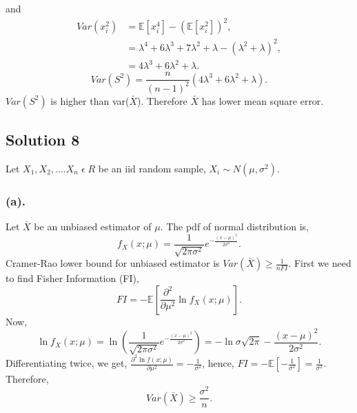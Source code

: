 \documentclass[a4paper,english,12pt]{article}
\begin{document}
and
\begin{align*}
Var(x_i^{2})&=\mathbb{E}[x_{i}^{4}]-(\mathbb{E}[x_i^{2}])^{2},\\
&=\lambda^{4}+6\lambda^{3}+7\lambda^{2}+\lambda-(\lambda^{2}+\lambda)^{2},\\
&=4\lambda^{3}+6\lambda^{2}+\lambda.
\end{align*}
\begin{equation*}
Var(S^{2}) = \frac{n}{(n-1)^{2}} (4\lambda^{3} + 6\lambda^{2} + \lambda).
\end{equation*}
$Var(S^{2})$ is higher than var($\bar X$). Therefore $\bar X$ has lower mean square error.
\hypertarget{solution8}{\subsection*{Solution 8}}
Let $X_1,X_2,....X_n\;\epsilon\;R$ be an iid random sample, $X_i\sim N(\mu,\sigma^{2})$.
\subsubsection*{(a).}
Let $\bar X$ be an unbiased estimator of $\mu$. The pdf of normal distribution is,
\begin{equation*}
f_{X}(x;\mu) = \frac{1}{\sqrt{2\pi\sigma^{2}}} e^{-\frac{(x-\mu)^{2}}{2\sigma^{2}}}.
\end{equation*}
Cramer-Rao lower bound for unbiased estimator is $Var(\bar X)\geq \frac{1}{nFI}$. First we need to find Fisher Information (FI),
\begin{equation*}
FI = -\mathbb{E}\left[\frac{\partial^{2}}{\partial\mu^{2}} \ln f_{X}(x;\mu)\right].
\end{equation*}
Now,
\begin{equation*}
\ln f_{X}(x;\mu) = \ln\left(\frac{1}{\sqrt{2\pi\sigma^{2}}} e^{-\frac{(x-\mu)^{2}}{2\sigma^{2}}}\right)=-\ln\sigma\sqrt{2\pi} - \frac{(x-\mu)^{2}}{2\sigma^{2}}.
\end{equation*}
Differentiating twice, we get, $\frac{\partial^{2} \ln f(x;\mu)}{\partial \mu^{2}} = -\frac{1}{\sigma^{2}}$, hence, $FI =-\mathbb{E}[-\frac{1}{\sigma^{2}}] = \frac{1}{\sigma^{2}}$. Therefore, 
\begin{equation*}
Var(\bar X) \geq \frac{\sigma^{2}}{n}.
\end{equation*}
\end{document}
